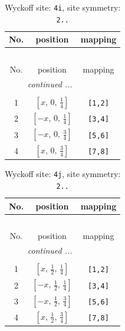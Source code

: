 \documentclass[fleqn,8pt]{jsarticle}
\begin{document}
\begin{longtable}{ccc}
\caption{Wyckoff site: {\tt 4i}, site symmetry: {\tt 2..}}
 \\
 \hline \hline
No. & position & mapping \\ \hline \endfirsthead

\multicolumn{2}{l}{\tablename\ \thetable{}} \\
 \hline \hline
No. & position & mapping \\ \hline \endhead

 \hline \hline
\multicolumn{2}{r}{\footnotesize\it continued ...} \\ \endfoot

 \hline \hline
\multicolumn{2}{r}{} \\ \endlastfoot

1 & $\left[ x,\, 0,\, \frac{1}{4} \right]$ & {\tt [1,2]} \\ \hline
2 & $\left[ - x,\, 0,\, \frac{1}{4} \right]$ & {\tt [3,4]} \\ \hline
3 & $\left[ - x,\, 0,\, \frac{3}{4} \right]$ & {\tt [5,6]} \\ \hline
4 & $\left[ x,\, 0,\, \frac{3}{4} \right]$ & {\tt [7,8]} \\
\end{longtable}
\renewcommand{\arraystretch}{1.2}
\begin{longtable}{ccc}
\caption{Wyckoff site: {\tt 4j}, site symmetry: {\tt 2..}}
 \\
 \hline \hline
No. & position & mapping \\ \hline \endfirsthead

\multicolumn{2}{l}{\tablename\ \thetable{}} \\
 \hline \hline
No. & position & mapping \\ \hline \endhead

 \hline \hline
\multicolumn{2}{r}{\footnotesize\it continued ...} \\ \endfoot

 \hline \hline
\multicolumn{2}{r}{} \\ \endlastfoot

1 & $\left[ x,\, \frac{1}{2},\, \frac{1}{4} \right]$ & {\tt [1,2]} \\ \hline
2 & $\left[ - x,\, \frac{1}{2},\, \frac{1}{4} \right]$ & {\tt [3,4]} \\ \hline
3 & $\left[ - x,\, \frac{1}{2},\, \frac{3}{4} \right]$ & {\tt [5,6]} \\ \hline
4 & $\left[ x,\, \frac{1}{2},\, \frac{3}{4} \right]$ & {\tt [7,8]} \\
\end{longtable}
\end{document}
